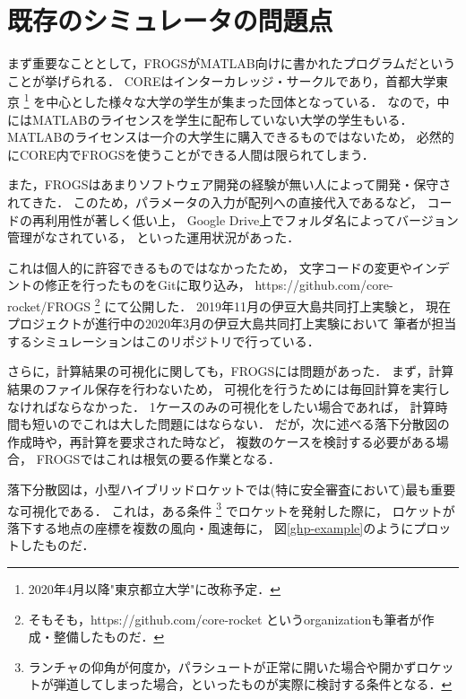 \documentclass[a4j,10pt]{jsarticle}
\begin{document}
\section{既存のシミュレータの問題点}


まず重要なこととして，FROGSがMATLAB向けに書かれたプログラムだということが挙げられる．
COREはインターカレッジ・サークルであり，首都大学東京
\footnote{2020年4月以降"東京都立大学"に改称予定．}
を中心とした様々な大学の学生が集まった団体となっている．
なので，中にはMATLABのライセンスを学生に配布していない大学の学生もいる．
MATLABのライセンスは一介の大学生に購入できるものではないため，
必然的にCORE内でFROGSを使うことができる人間は限られてしまう．

また，FROGSはあまりソフトウェア開発の経験が無い人によって開発・保守されてきた．
このため，パラメータの入力が配列への直接代入であるなど，
コードの再利用性が著しく低い上，
Google Drive上でフォルダ名によってバージョン管理がなされている，
といった運用状況があった．

これは個人的に許容できるものではなかったため，
文字コードの変更やインデントの修正を行ったものをGitに取り込み，
https://github.com/core-rocket/FROGS
\footnote{そもそも，https://github.com/core-rocket というorganizationも筆者が作成・整備したものだ．}
にて公開した．
2019年11月の伊豆大島共同打上実験と，
現在プロジェクトが進行中の2020年3月の伊豆大島共同打上実験において
筆者が担当するシミュレーションはこのリポジトリで行っている．

さらに，計算結果の可視化に関しても，FROGSには問題があった．
まず，計算結果のファイル保存を行わないため，
可視化を行うためには毎回計算を実行しなければならなかった．
1ケースのみの可視化をしたい場合であれば，
計算時間も短いのでこれは大した問題にはならない．
だが，次に述べる落下分散図の作成時や，再計算を要求された時など，
複数のケースを検討する必要がある場合，
FROGSではこれは根気の要る作業となる．

落下分散図は，小型ハイブリッドロケットでは(特に安全審査において)最も重要な可視化である．
これは，ある条件
\footnote{ランチャの仰角が何度か，パラシュートが正常に開いた場合や開かずロケットが弾道してしまった場合，といったものが実際に検討する条件となる．}
でロケットを発射した際に，
ロケットが落下する地点の座標を複数の風向・風速毎に，
図\ref{ghp-example}のようにプロットしたものだ．
\end{document}
